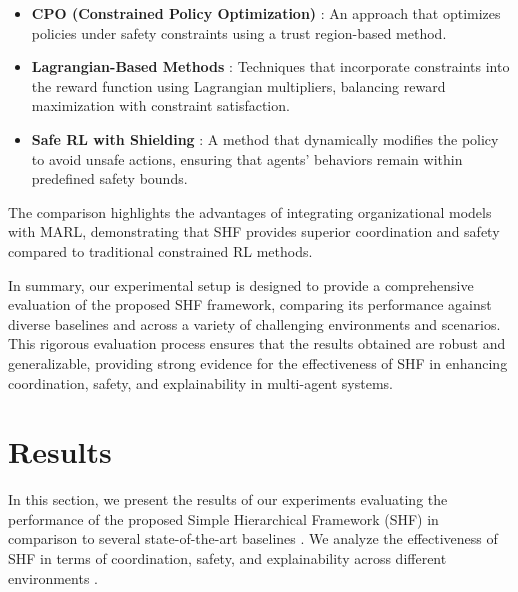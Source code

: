 \documentclass[sigconf,anonymous]{aamas}
\begin{document}
\begin{itemize}
    \item \textbf{CPO (Constrained Policy Optimization)} \cite{achiam2017cpo}: An approach that optimizes policies under safety constraints using a trust region-based method.
    \item \textbf{Lagrangian-Based Methods} \cite{ray2019benchmarking}: Techniques that incorporate constraints into the reward function using Lagrangian multipliers, balancing reward maximization with constraint satisfaction.
    \item \textbf{Safe RL with Shielding} \cite{alshiekh2018safe}: A method that dynamically modifies the policy to avoid unsafe actions, ensuring that agents' behaviors remain within predefined safety bounds.
\end{itemize}


The comparison highlights the advantages of integrating organizational models with MARL, demonstrating that SHF provides superior coordination and safety compared to traditional constrained RL methods.

In summary, our experimental setup is designed to provide a comprehensive evaluation of the proposed SHF framework, comparing its performance against diverse baselines and across a variety of challenging environments and scenarios. This rigorous evaluation process ensures that the results obtained are robust and generalizable, providing strong evidence for the effectiveness of SHF in enhancing coordination, safety, and explainability in multi-agent systems.


\section{Results}
\label{sec:results}

In this section, we present the results of our experiments evaluating the performance of the proposed Simple Hierarchical Framework (SHF) in comparison to several state-of-the-art baselines \cite{foerster2018counterfactual}. We analyze the effectiveness of SHF in terms of coordination, safety, and explainability across different environments \cite{wei2019safe, soule2024}.
\end{document}
